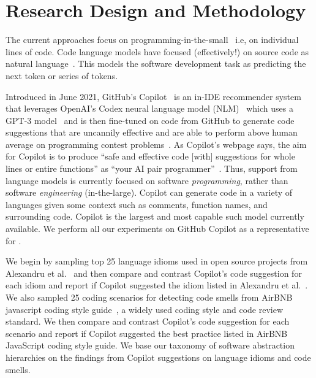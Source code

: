 \section{Research Design and Methodology}
The current \cct{} approaches focus on programming-in-the-small~\cite{DeRemer1976} i.e, on individual lines of code. 
Code language models have focused (effectively!) on source code as natural language~\cite{natural}.
This models the software development task as predicting the next token or series of tokens.

Introduced in June 2021, GitHub's Copilot~\cite{Copilot-web} is an in-IDE recommender system that leverages OpenAI's Codex neural language model (NLM)~\cite{copilot} which uses a GPT-3 model~\cite{Gpt3} and is then fine-tuned on code from GitHub to generate code suggestions that are uncannily effective and are able to perform above human average on programming contest problems~\cite{empirical_eval}. As Copilot's webpage says, the aim for Copilot is to produce ``safe and effective code [with] suggestions for whole lines or entire functions'' as ``your AI pair programmer''~\cite{Copilot-web}. 
Thus, support from language models is currently focused on software \textit{programming}, rather than software \emph{engineering} (in-the-large).
Copilot can generate code in a variety of languages given some context such as comments, function names, and surrounding code. Copilot is the largest and most capable such model currently available. We perform all our experiments on GitHub Copilot as a representative for \cct{}.

We begin by sampling top 25 language idioms used in open source projects from Alexandru et al.~\cite{Alexandru2018} and then compare and contrast Copilot's code suggestion for each idiom and report if Copilot suggested the idiom listed in Alexandru et al.~\cite{Alexandru2018}. 
We also sampled 25 coding scenarios for detecting code smells from AirBNB javascript coding style guide~\cite{airbnb_code}, a widely used coding style and code review standard. We then compare and contrast Copilot's code suggestion for each scenario and report if Copilot suggested the best practice listed in AirBNB JavaScript coding style guide. 
We base our taxonomy of software abstraction hierarchies on the findings from Copilot suggestions on language idioms and code smells.

